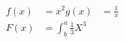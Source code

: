 \documentclass{article}
\begin{document}
	\begin{align*}
		f(x) &= x^2
		g(x) &= \frac{1}{x}\\
		F(x) &= \int^a_b
		\frac{1}{3}X^3
	\end{align*}
\end{document}
